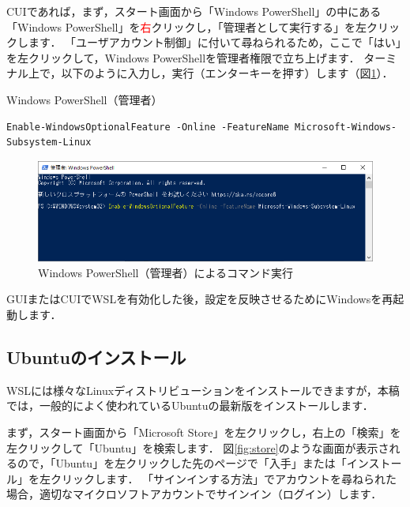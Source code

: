 \documentclass[dvipdfmx]{jarticle}
\begin{document}
CUIであれば，まず，スタート画面から「Windows PowerShell」の中にある「Windows PowerShell」を\textcolor{red}{右}クリックし，「管理者として実行する」を左クリックします．
「ユーザアカウント制御」に付いて尋ねられるため，ここで「はい」を左クリックして，Windows PowerShellを管理者権限で立ち上げます．
ターミナル上で，以下のように入力し，実行（エンターキーを押す）します（図\ref{fig:PS}）．
\begin{itembox}[l]{Windows PowerShell（管理者）}
\begin{verbatim}
Enable-WindowsOptionalFeature -Online -FeatureName Microsoft-Windows-Subsystem-Linux
\end{verbatim}
\end{itembox}

\begin{figure}[h]
  \centering
  \includegraphics[width=0.95\linewidth]{figures/PowerShell.png}
  \caption{Windows PowerShell（管理者）によるコマンド実行}
  \label{fig:PS}
\end{figure}

GUIまたはCUIでWSLを有効化した後，設定を反映させるためにWindowsを再起動します．

\subsection{Ubuntuのインストール}\label{sec:ubuntu}

WSLには様々なLinuxディストリビューションをインストールできますが，本稿では，一般的によく使われているUbuntuの最新版をインストールします．

まず，スタート画面から「Microsoft Store」を左クリックし，右上の「検索」を左クリックして「Ubuntu」を検索します．
図\ref{fig:store}のような画面が表示されるので，「Ubuntu」を左クリックした先のページで「入手」または「インストール」を左クリックします．
「サインインする方法」でアカウントを尋ねられた場合，適切なマイクロソフトアカウントでサインイン（ログイン）します．
\end{document}
